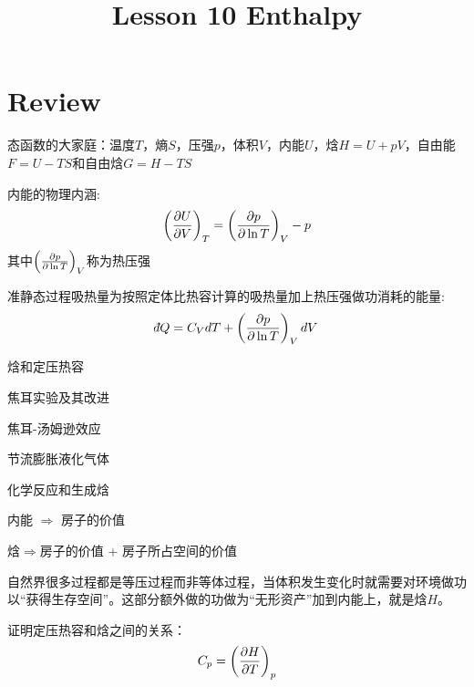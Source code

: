 \documentclass[CJK]{beamer}
\title{Lesson 10 Enthalpy}
\author{}
\date{}
\begin{document}

\section{Review}

\begin{frame}
\bch 
\bitem
\item{态函数的大家庭：温度$T$，熵$S$，压强$p$，体积$V$，内能$U$，焓$H=U+pV$，自由能$F=U-TS$和自由焓$G=H-TS$}
\item{内能的物理内涵:
 $$\left(\frac{\partial U}{\partial V}\right)_{T} = \left(\frac{\partial p}{\partial \ln T}\right)_{V} - p $$
其中$\left(\frac{\partial p}{\partial \ln T}\right)_{V}$称为热压强}
\item{准静态过程吸热量为按照定体比热容计算的吸热量加上热压强做功消耗的能量:
$$ \dbar Q = C_V dT + \pfrac p{\ln T}V dV$$}
\eitem
\ech
\end{frame}

\begin{frame}
\bch
\bitem
\item{焓和定压热容}
\item{焦耳实验及其改进}
\item{焦耳-汤姆逊效应}
\item{节流膨胀液化气体}
\item{化学反应和生成焓}
\eitem
\ech
\end{frame}

\begin{frame}
\bch


\ech
\end{frame}

\begin{frame}
\bch

内能 $\Rightarrow$ 房子的价值

\skipline

焓$\Rightarrow$房子的价值 + 房子所占空间的价值

\skiplines

自然界很多过程都是等压过程而非等体过程，当体积发生变化时就需要对环境做功以“获得生存空间”。这部分额外做的功做为“无形资产”加到内能上，就是焓$H$。


\ech
\end{frame}


\begin{frame}
\bch
{}

证明定压热容和焓之间的关系：
$$ C_p = \left(\frac{\partial H}{\partial T}\right)_{p} $$

\ech
\end{frame}
\end{document}
